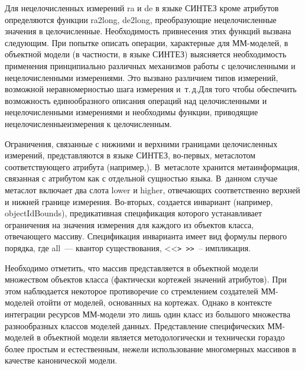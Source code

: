 \begin{multicols}{2}
        Для нецелочисленных измерений {\sf ra} и {\sf de} в языке СИНТЕЗ кроме 
атрибутов определяются функции {\sf ra2long}, {\sf de2long}, преобразующие 
нецелочисленные значения в целочисленные. Необходимость при\-вне\-се\-ния этих 
функций вызвана следующим. При попытке описать операции, характерные для 
ММ-мо\-де\-лей, в объектной модели (в частности, в языке СИНТЕЗ) 
выясняется необходимость применения принципиально различных механизмов 
работы с целочисленными и нецелочисленными измерениями. Это вызвано 
различием типов измерений, возможной неравномерностью шага измерения 
и~т.\,д.\linebreak Для того чтобы обеспечить возможность единообразного описания 
операций над цело\-чис\-лен\-ными и нецелочисленными измерениями и 
необходимы функции, приводящие нецелочисленные\linebreak измерения к 
целочисленным.
        
        Ограничения, связанные с нижними и верхними границами 
целочисленных измерений, пред\-став\-ля\-ют\-ся в языке СИНТЕЗ, во-пер\-вых, 
мета\-слотом соответствующего атрибута (например,). В~метаслоте 
хранится метаинформация, связанная с атрибутом как с отдельной сущностью 
языка. В~данном случае метаслот включает два слота {\sf lower} и {\sf higher}, 
отвечающих соответственно верхней и нижней границе измерения. 
        Во-вто\-рых, создается инвариант (например, {\sf objectIdBounds}), 
предикативная спецификация которого устанавливает ограничения на значения 
измерения для каждого из объектов класса, отвечающего массиву. 
Спецификация инварианта имеет вид формулы первого порядка, где {\sf all}~--- 
квантор существования, <<\verb -> >> --- импликация.
        
        Необходимо отметить, что массив представляется в объектной модели 
множеством объектов класса (фактически кортежей значений атрибутов). При 
этом наблюдается некоторое противоречие со стремлением создателей 
        ММ-мо\-де\-лей \mbox{отойти} от моделей, основанных на кортежах. Однако в 
контексте интеграции ресурсов ММ-мо\-де\-ли это лишь один класс из 
большого множества разнообразных классов моделей данных. Представление 
специфических ММ-мо\-де\-лей в объектной модели является методологически 
и технически гораздо более простым и естественным, нежели использование 
многомерных массивов в качестве канонической модели.
        

\end{multicols}
